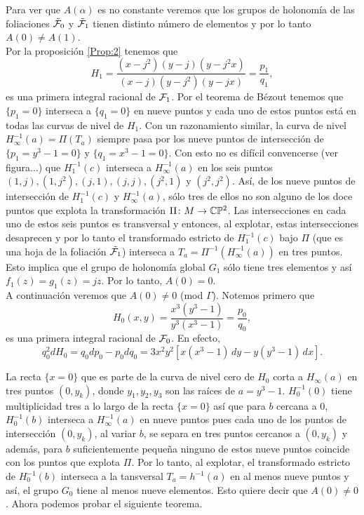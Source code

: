 Para ver que $A(\alpha)$ es no constante veremos que los grupos de holonomía de las foliaciones $\tilde{\mathcal{F}}_{0}$ y $\tilde{\mathcal{F}}_{1}$ tienen distinto número de elementos y por lo tanto $A(0)\neq A(1)$.\\

Por la proposición \ref{Prop:2} tenemos que $$H_{1}=\frac{(x-j^{2})(y-j)(y-j^{2}x)}{(x-j)(y-j^{2})(y-jx)}=\frac{p_{1}}{q_{1}},$$ es una primera integral racional de $\mathcal{F}_{1}$. Por el teorema de Bézout tenemos que $\{p_{1}=0\}$ interseca a $\{q_{1}=0\}$ en nueve puntos y cada uno de estos puntos está en todas las curvas de nivel de $H_{1}$. Con un razonamiento similar, la curva de nivel $H_{\infty}^{-1}(a)=\Pi(T_{a})$ siempre pasa por los nueve puntos de intersección de $\{p_{1}=y^{3}-1=0\}$ y $\{q_{1}=x^{3}-1=0\}$. Con esto no es difícil convencerse (ver figura...) que $H^{-1}_{1}(c)$ interseca a $H^{-1}_{\infty}(a)$ en los seis puntos $(1,j),(1,j^{2}),(j,1),(j,j),(j^{2},1)$ y $(j^{2},j^{2})$. Así, de los nueve puntos de intersección de $H^{-1}_{1}(c)$ y $H^{-1}_{\infty}(a)$, sólo tres de ellos no son alguno de los doce puntos que explota la transformación $\Pi\colon M\rightarrow\mathbb{C}\mathbb{P}^2$. Las intersecciones en cada uno de estos seis puntos es transversal y entonces, al explotar, estas intersecciones desaprecen y por lo tanto el transformado estricto de $H^{-1}_{1}(c)$ bajo $\Pi$ (que es una hoja de la foliación $\tilde{\mathcal{F}_{1}}$) interseca a $T_{a}=\Pi^{-1}(H^{-1}_{\infty}(a))$ en tres puntos. Esto implica que el grupo de holonomía global $G_{1}$ sólo tiene tres elementos y así $f_{1}(z)=g_{1}(z)=jz$. Por lo tanto, $A(0)=0$.\\

A continuación veremos que $A(0)\neq 0$ (mod $\Gamma$). Notemos primero que $$H_{0}(x,y)=\frac{x^{3}(y^{3}-1)}{y^{3}(x^{3}-1)}=\frac{p_{0}}{q_{0}},$$ es una primera integral racional de $\mathcal{F}_{0}$. En efecto, $$q_{0}^{2}dH_{0}=q_{0}dp_{0}-p_{0}dq_{0}=3x^{2}y^{2}[x(x^{3}-1)\, dy-y(y^{3}-1)\, dx].$$

La recta $\{x=0\}$ que es parte de la curva de nivel cero de $H_{0}$ corta a $H_{\infty}(a)$ en tres puntos $(0,y_{k})$, donde $y_{1},y_{2},y_{3}$ son las raíces de $a=y^{3}-1$. $H_{0}^{-1}(0)$ tiene multiplicidad tres a lo largo de la recta $\{x=0\}$ así que para $b$ cercana a $0$, $H_{0}^{-1}(b)$ interseca a $H_{\infty}^{-1}(a)$ en nueve puntos  pues cada uno de los puntos de intersección $(0,y_{k})$, al variar $b$, se separa en tres puntos cercanos a $(0,y_{k})$ y además, para $b$ suficientemente pequeña ninguno de estos nueve puntos coincide con los puntos que explota $\Pi$. Por lo tanto, al explotar, el transformado estricto de $H_{0}^{-1}(b)$ interseca a la tansversal $T_{a}=h^{-1}(a)$ en al menos nueve puntos y así, el grupo $G_{0}$ tiene al menos nueve elementos. Esto quiere decir que $A(0)\neq 0$. Ahora podemos probar el siguiente teorema.

